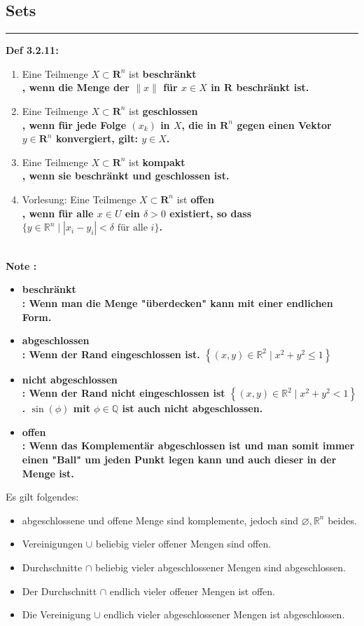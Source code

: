 \documentclass[7pt,landscape, margin = 0.1mm]{article}
\newcommand*{\mysubsection}[1]{\vspace{-2mm}\color{chaptercolor}\subsection{ #1 }
\vspace{-1mm}\hrule\vspace{1.5mm}\color{black}
\vspace{2mm}}
\newcommand{\COL}[1]{ \color{chaptercolor} \bf{#1}\color{black}     \\}
\newcommand{\DEF}[2]{\color{chaptercolor}\bf{Def #1}:\color{black}    \hspace{0.2cm} #2 \\}
\newcommand{\NOTE}[2]{\color{chaptercolor}\bf{Note #1}:\color{black}    \hspace{0.2cm} #2 \\}
\begin{document}
\begin{multicols}{4}
\begin{flushleft}
{}

\mysubsection{Sets}

\DEF{3.2.11}{
\begin{enumerate}
\item Eine Teilmenge \(X \subset \mathbf{R}^n\) ist \COL{beschränkt}, wenn die Menge der \(\|x\|\) für \(x \in X\) in \(\mathbf{R}\) beschränkt ist.
\item Eine Teilmenge \(X \subset \mathbf{R}^n\) ist \COL{geschlossen}, wenn für jede Folge \(\left(x_k\right)\) in \(X\), die in \(\mathbf{R}^n\) gegen einen Vektor \(y \in \mathbf{R}^n\) konvergiert, gilt: \(y \in X\).
\item Eine Teilmenge \(X \subset \mathbf{R}^n\) ist \COL{kompakt}, wenn sie beschränkt und geschlossen ist.
\item Vorlesung: Eine Teilmenge \(X \subset \mathbf{R}^n\) ist \COL{offen}, wenn für alle \(x \in U\) ein \(\delta > 0\) existiert, so dass \(\{ y \in \mathbb{R}^{n} \mid |x_{i}-y_{i}| < \delta \text{ für alle }i \}\).
\end{enumerate}
}

\NOTE{}{
\begin{itemize}
\item \COL{beschränkt}: Wenn man die Menge "überdecken" kann mit einer endlichen Form.
\item \COL{abgeschlossen}: Wenn der Rand eingeschlossen ist. $\left\{(x, y) \in \mathbb{R}^2 \mid x^2+y^2 \leq 1 \right\}$
\item \COL{nicht abgeschlossen}: Wenn der Rand nicht eingeschlossen ist $\left\{(x, y) \in \mathbb{R}^2 \mid x^2+y^2 < 1 \right\}$. $\sin(\phi)$ mit $\phi \in \mathbb{Q}$ ist auch nicht abgeschlossen. 
\item \COL{offen}: Wenn das Komplementär abgeschlossen ist und man somit immer einen "Ball" um jeden Punkt legen kann und auch dieser in der Menge ist.   
\end{itemize}
Es gilt folgendes:
\begin{itemize}
\item abgeschlossene und offene Menge sind komplemente, jedoch sind  $\varnothing, \mathbb{R}^{n}$ beides.
\item Vereinigungen $\cup$ beliebig vieler offener Mengen sind offen.
\item Durchschnitte $\cap$ beliebig vieler abgeschlossener Mengen sind abgeschlossen.
\item Der Durchschnitt $\cap$ endlich vieler offener Mengen ist offen.
\item Die Vereinigung $\cup$ endlich vieler abgeschlossener Mengen ist abgeschlossen.


\end{itemize}}
\end{flushleft}
\end{multicols}
\end{document}
